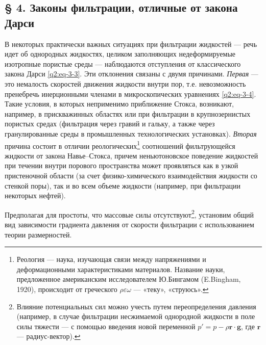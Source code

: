 \subsection*{§ 4. Законы фильтрации, отличные от закона Дарси}
\label{q2:sec-4}
\setcounter{footnote}{0}
В некоторых практически важных ситуациях при фильтрации жидкостей --- речь идет об однородных жидкостях, целиком заполняющих недеформируемые изотропные пористые среды --- наблюдаются отступления от классического закона Дарси \eqref{q2:eq-3-3}. Эти отклонения связаны с двумя причинами. \textit{Первая} --- это немалость скоростей движения жидкости внутри пор, т.е. невозможность пренебречь инерционными членами в микроскопических уравнениях \eqref{q2:eq-3-4}. Такие условия, в которых неприменимо приближение Стокса, возникают, например, в прискважинных областях или при фильтрации в крупнозернистых пористых средах (фильтрация через гравий и гальку, а также через гранулированные среды в промышленных технологических установках). \textit{Вторая} причина состоит в отличии реологических\footnote{Реология --- наука, изучающая связи между напряжениями и деформационными характеристиками материалов. Название науки, предложенное американским исследователем Ю.Бингамом (E.Bingham, 1920), происходит от греческого $\rho\varepsilon\omega$ --- «теку», «струюсь».} соотношений фильтрующейся жидкости от закона Навье--Стокса, причем неньютоновское поведение жидкостей при течении внутри порового пространства может проявляться как в узкой пристеночной области (за счет физико-химического взаимодействия жидкости со стенкой поры), так и во всем объеме жидкости (например, при фильтрации некоторых нефтей).

Предполагая для простоты, что массовые силы отсутствуют\footnote{Влияние потенциальных сил можно учесть путем переопределения давления (например, в случае фильтрации несжимаемой однородной жидкости в поле силы тяжести --- с помощью введения новой переменной $p'=p-\rho\boldsymbol{r}\cdot\boldsymbol{g}$, где $\boldsymbol{r}$ --- радиус-вектор).}, установим общий вид зависимости градиента давления от скорости фильтрации с использованием теории размерностей.

